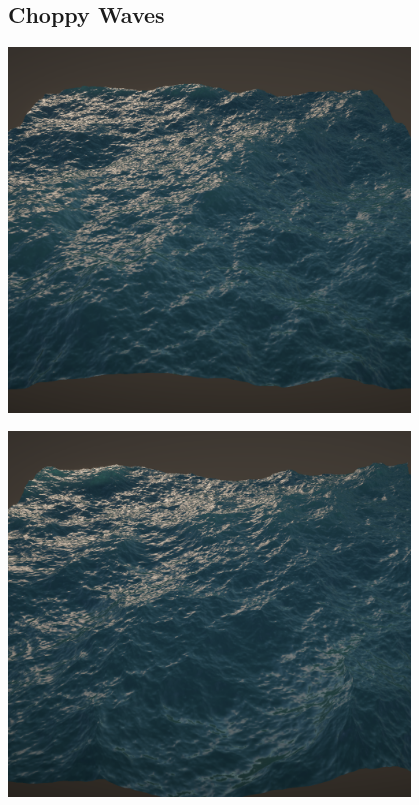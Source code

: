 \subsection{Choppy Waves}
\begin{minipage}{0.49\textwidth}
    \centering
    \includegraphics[width=0.8\textwidth]{"images/rendered_height_no_coppy.png"}
    \label{fig:ocean_no_choppy}
\end{minipage}
\begin{minipage}{0.49\textwidth}
    \centering
    \includegraphics[width=0.8\textwidth]{"images/rendered_height_choppy.png"}
    \label{fig:ocean_choppy}
\end{minipage}
\vspace{0.3cm}

